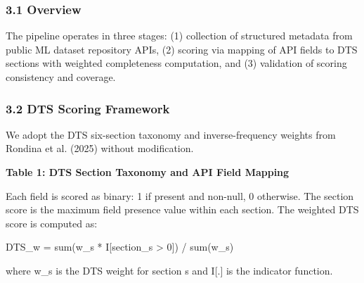 
\subsubsection{3.1 Overview}

The pipeline operates in three stages: (1) collection of structured metadata from public ML dataset repository APIs, (2) scoring via mapping of API fields to DTS sections with weighted completeness computation, and (3) validation of scoring consistency and coverage.

\subsubsection{3.2 DTS Scoring Framework}

We adopt the DTS six-section taxonomy and inverse-frequency weights from Rondina et al. (2025) without modification.

\textbf{Table 1: DTS Section Taxonomy and API Field Mapping}

\begin{table}[htbp]
\centering
{}
\end{table}

Each field is scored as binary: 1 if present and non-null, 0 otherwise. The section score is the maximum field presence value within each section. The weighted DTS score is computed as:

DTS\_w = sum(w\_s * I[section\_s > 0]) / sum(w\_s)

where w\_s is the DTS weight for section s and I[.] is the indicator function.

